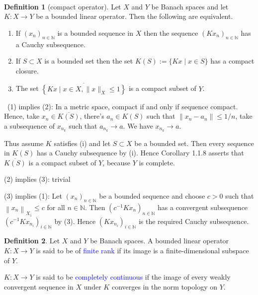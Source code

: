 \documentclass[12pt,a4paper]{book}
\newenvironment{prooff}{{\noindent\it\textcolor{cyan!40!black}{Proof}:}\,}{\par}
\newcommand{\blue}[1]{\textcolor{blue}{#1}}
\newcommand{\norm}[1]{\|{#1}\|}
\newenvironment{enu}{\begin{enumerate}[(1)]}{\end{enumerate}}
\theoremstyle{definition}
\newtheorem{defn}{Definition}[section]
\begin{document}
\begin{prooff}
    
\end{prooff}
\begin{defn}[compact operator]
    Let $X$ and $Y$ be Banach spaces and let $K: X \rightarrow Y$ be a bounded linear operator. Then the following are equivalent.
\begin{enu} 
    \item If $\left(x_n\right)_{n \in \mathbb{N}}$ is a bounded sequence in $X$ then the sequence $\left(K x_n\right)_{n \in \mathbb{N}}$ has a Cauchy subsequence.
    \item If $S \subset X$ is a bounded set then the set $K(S):=\{K x \mid x \in S\}$ has a compact closure.
    \item The set $\overline{\left\{K x \mid x \in X,\|x\|_X \leq 1\right\}}$ is a compact subset of $Y$.
\end{enu}
\end{defn}
\begin{prooff}
    (1) implies (2): In a metric space, compact if and only if sequence compact. Hence, take 
    $x_n\in \overline{K(S)}$, there's $a_n\in K(S)$ such that $\norm{x_n-a_n}\le 1/n$, take a subsequence of 
    $x_{n_k}$ such that $a_{n_k}\to a$. We have $x_{n_k}\to a$. 
    
    
    Thus assume $K$ satisfies (i) and let $S \subset X$ be a bounded set. Then every sequence in $K(S)$ has a Cauchy subsequence by (i). Hence Corollary 1.1.8 asserts that $\overline{K(S)}$ is a compact subset of $Y$, because $Y$ is complete.
    
    (2) implies (3): trivial 

    (3) implies (1): 
    Let $\left(x_n\right)_{n \in \mathbb{N}}$ be a bounded sequence and choose $c>0$ such that $\left\|x_n\right\|_{X_1} \leq c$ for all $n \in \mathbb{N}$. 
    Then $\left(c^{-1} K x_n\right)_{n \in \mathbb{N}}$ has a convergent subsequence $\left(c^{-1} K x_{n_i}\right)_{i \in \mathbb{N}}$ by (3). 
    Hence $\left(K x_{n_i}\right)_{i \in \mathbb{N}}$ is the required Cauchy subsequence. 
    
\end{prooff}
\begin{defn}
    Let $X$ and $Y$ be Banach spaces. A bounded linear operator $K: X \rightarrow Y$ is said to be
    of \blue{finite rank} if its image is a finite-dimensional subspace of $Y$. 
    
    $K: X \rightarrow Y$ is said to be 
    \blue{completely continuous} if the image of every weakly convergent sequence in $X$ under $K$ converges in the norm topology on $Y$.
\end{defn}
\end{document}
